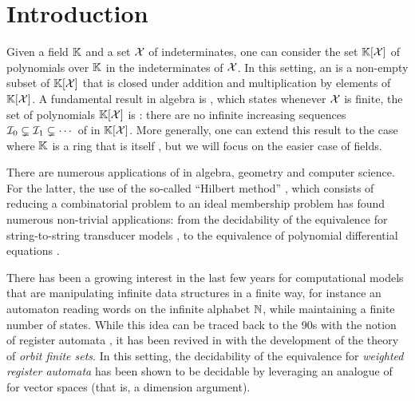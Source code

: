 \section{Introduction}
\label{sec:intro}

\AP Given a field $\mathbb{K}$ and a set $\mathcal{X}$ of indeterminates, one can consider the
set $\mathbb{K}[\mathcal{X}]$ of polynomials over $\mathbb{K}$ in the indeterminates of $\mathcal{X}$. In
this setting, an  is a non-empty subset of $\mathbb{K}[\mathcal{X}]$ that is
closed under addition and multiplication by elements of $\mathbb{K}[\mathcal{X}]$. A
fundamental result in algebra is , which states
whenever $\mathcal{X}$ is finite, the set of polynomials $\mathbb{K}[\mathcal{X}]$ is
 \cite{HILB1890}: there are no infinite increasing sequences
$\idl_0 \subsetneq \idl_1 \subsetneq \cdots$ of  in $\mathbb{K}[\mathcal{X}]$.
More generally, one can extend this result to the case where $\mathbb{K}$ is a ring
that is itself , but we will focus on the easier case of fields.

\AP There are numerous applications of  in algebra,
geometry and computer science. For the latter, the use of the so-called
``Hilbert method'' \cite{BOJAN19,SCHMUDE2021}, which consists of reducing a
combinatorial problem to an ideal membership problem has found numerous
non-trivial applications: from the decidability of the equivalence for
string-to-string transducer models \cite{HONKALA00,BEDUSHWO17}, to the
equivalence of polynomial differential equations \cite{CLEMENTE24}.

\AP There has been a growing interest in the last few years for computational
models that are manipulating infinite data structures in a finite way, for
instance an automaton reading words on the infinite alphabet $\mathbb{N}$, while
maintaining a finite number of states. While this idea can be traced back to
the 90s with the notion of register automata \cite{KAFR94}, it has been revived
in with the development of the theory of \emph{orbit finite sets}. In this
setting, the decidability of the equivalence for \emph{weighted register
automata} has been shown to be decidable \cite{BOKLMO24,BOKLMO21} by leveraging
an analogue of  for vector spaces (that is, a dimension argument).

